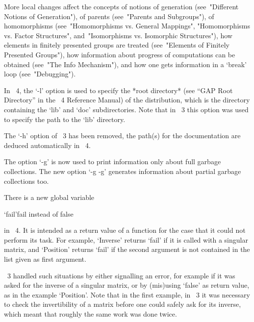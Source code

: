 More local changes affect the concepts of notions of generation
(see~"Different Notions of Generation"),
of parents (see~"Parents and Subgroups"),
of homomorphisms (see~"Homomorphisms vs. General Mappings",
"Homomorphisms vs. Factor Structures",
and~"Isomorphisms vs. Isomorphic Structures"),
how elements in finitely presented groups are treated
(see~"Elements of Finitely Presented Groups"),
how information about progress of computations can be obtained
(see~"The Info Mechanism"),
and how one gets information in a `break' loop
(see~"Debugging").





In {\GAP}~4, the `-l' option is used to specify the *root directory*
(see ``GAP Root Directory'' in the {\GAP}~4 Reference Manual)
of the {\GAP} distribution,
which is the directory containing the `lib' and `doc' subdirectories.
Note that in {\GAP}~3 this option was used to specify the path to the
`lib' directory.

The `-h' option of {\GAP}~3 has been removed,
the path(s) for the documentation are deduced automatically in {\GAP}~4.

The option `-g' is now used to print information only about full garbage
collections.
The new option `-g -g' generates  information about partial
garbage collections too.



There is a new global variable

\>`fail'{fail instead of false}

in {\GAP}~4.
It is intended as a return value of a function for the case that it
could not perform its task.
For example, `Inverse' returns `fail' if it is called with a singular
matrix, and `Position' returns `fail' if the second argument is not
contained in the list given as first argument.

{\GAP}~3 handled such situations by either signalling an error,
for example if it was asked for the inverse of a singular matrix,
or by (mis)using `false' as return value, as in the example `Position'.
Note that in the first example, in {\GAP}~3 it was necessary to check
the invertibility of a matrix before one could safely ask for its
inverse, which meant that roughly the same work was done twice.


